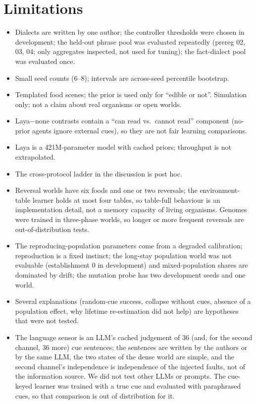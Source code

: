 \documentclass[11pt]{article}
\begin{document}
\section{Limitations}
\begin{itemize}
  \item Dialects are written by one author; the controller thresholds were chosen in development; the held-out phrase pool was evaluated repeatedly (prereg 02, 03, 04; only aggregates inspected, not used for tuning); the fact-dialect pool was evaluated once.
  \item Small seed counts (6--8); intervals are across-seed percentile bootstrap.
  \item Templated food scenes; the prior is used only for ``edible or not''. Simulation only; not a claim about real organisms or open worlds.
  \item Laya$-$none contrasts contain a ``can read vs.\ cannot read'' component (no-prior agents ignore external cues), so they are not fair learning comparisons.
  \item Laya is a 421M-parameter model with cached priors; throughput is not extrapolated.
  \item The cross-protocol ladder in the discussion is post hoc.
  \item Reversal worlds have six foods and one or two reversals; the environment-table learner holds at most four tables, so table-full behaviour is an implementation detail, not a memory capacity of living organisms. Genomes were trained in three-phase worlds, so longer or more frequent reversals are out-of-distribution tests.
  \item The reproducing-population parameters come from a degraded calibration; reproduction is a fixed instinct; the long-stay population world was not evaluable (establishment 0 in development) and mixed-population shares are dominated by drift; the mutation probe has two development seeds and one world.
  \item Several explanations (random-cue success, collapse without cues, absence of a population effect, why lifetime re-estimation did not help) are hypotheses that were not tested.
  \item The language sensor is an LLM's cached judgement of 36 (and, for the second channel, 36 more) cue sentences; the sentences are written by the authors or by the same LLM, the two states of the dense world are simple, and the second channel's independence is independence of the injected faults, not of the information source. We did not test other LLMs or prompts. The cue-keyed learner was trained with a true cue and evaluated with paraphrased cues, so that comparison is out of distribution for it.

\end{itemize}
\end{document}
